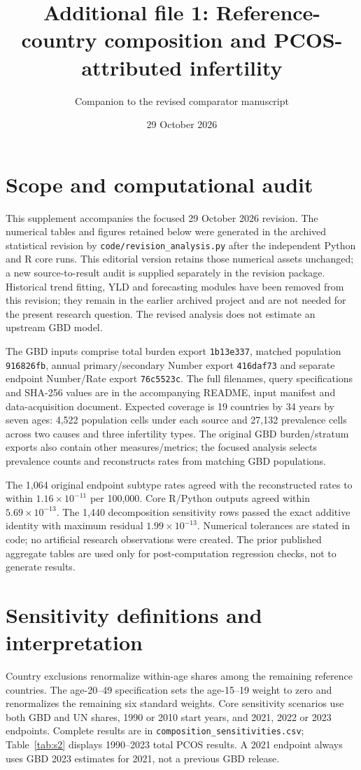 \documentclass[11pt,a4paper]{article}
\title{Additional file 1: Reference-country composition and PCOS-attributed infertility}
\author{Companion to the revised comparator manuscript}
\date{29 October 2026}
\begin{document}
\maketitle
\renewcommand{\thetable}{S\arabic{table}}\setcounter{table}{0}
\renewcommand{\thefigure}{S\arabic{figure}}\setcounter{figure}{0}
\section{Scope and computational audit}
This supplement accompanies the focused 29 October 2026 revision. The numerical tables and figures retained below were generated in the archived statistical revision by \texttt{code/revision\_analysis.py} after the independent Python and R core runs. This editorial version retains those numerical assets unchanged; a new source-to-result audit is supplied separately in the revision package. Historical trend fitting, YLD and forecasting modules have been removed from this revision; they remain in the earlier archived project and are not needed for the present research question. The revised analysis does not estimate an upstream GBD model.

The GBD inputs comprise total burden export \texttt{1b13e337}, matched population \texttt{916826fb}, annual primary/secondary Number export \texttt{416daf73} and separate endpoint Number/Rate export \texttt{76c5523c}. The full filenames, query specifications and SHA-256 values are in the accompanying README, input manifest and data-acquisition document. Expected coverage is 19 countries by 34 years by seven ages: 4,522 population cells under each source and 27,132 prevalence cells across two causes and three infertility types. The original GBD burden/stratum exports also contain other measures/metrics; the focused analysis selects prevalence counts and reconstructs rates from matching GBD populations.

The 1,064 original endpoint subtype rates agreed with the reconstructed rates to within $1.16\times10^{-11}$ per 100,000. Core R/Python outputs agreed within $5.69\times10^{-13}$. The 1,440 decomposition sensitivity rows passed the exact additive identity with maximum residual $1.99\times10^{-13}$. Numerical tolerances are stated in code; no artificial research observations were created. The prior published aggregate tables are used only for post-computation regression checks, not to generate results.

\section{Sensitivity definitions and interpretation}
Country exclusions renormalize within-age shares among the remaining reference countries. The age-20--49 specification sets the age-15--19 weight to zero and renormalizes the remaining six standard weights. Core sensitivity scenarios use both GBD and UN shares, 1990 or 2010 start years, and 2021, 2022 or 2023 endpoints. Complete results are in \texttt{composition\_sensitivities.csv}; Table~\ref{tab:s2} displays 1990--2023 total PCOS results. A 2021 endpoint always uses GBD 2023 estimates for 2021, not a previous GBD release.
\end{document}
